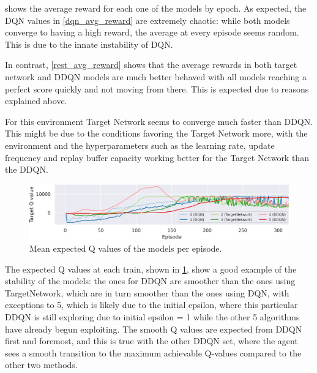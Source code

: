  shows the average reward for each one of the models by epoch.
As expected, the DQN values in \cref{dqn_avg_reward} are extremely chaotic: while both models converge to having a high reward, the average at every episode seems random.
This is due to the innate instability of DQN\cite{reinforcement_learning_introduction}.

In contrast, \cref{rest_avg_reward} shows that the average rewards in both target network and DDQN models are much better behaved with all models reaching a perfect score quickly and not moving from there. This is expected due to reasons explained above.

For this environment Target Network seems to converge much faster than DDQN. This might be due to the conditions favoring the Target Network more, with the environment and the hyperparameters such as the learning rate, update frequency and replay buffer capacity working better for the Target Network than the DDQN.





\begin{figure}[h]
	\includegraphics[width=\textwidth]{q_values.png}
	\caption{Mean expected Q values of the models per episode.}
	\label{q_values}
	\vspace{-14pt}
\end{figure}

The expected Q values at each train, shown in \cref{q_values}, show a good example of the stability of the models: the ones for DDQN are smoother than the ones using TargetNetwork, which are in turn smoother than the ones using DQN, with exceptions to \colorbox{id5}{5}, which is likely due to the initial epsilon, where this particular DDQN is still exploring due to initial epsilon = 1 while the other 5 algorithms have already begun exploiting. The smooth Q values are expected from DDQN first and foremost, and this is true with the other DDQN set, where the agent sees a smooth transition to the maximum achievable Q-values compared to the other two methods.

